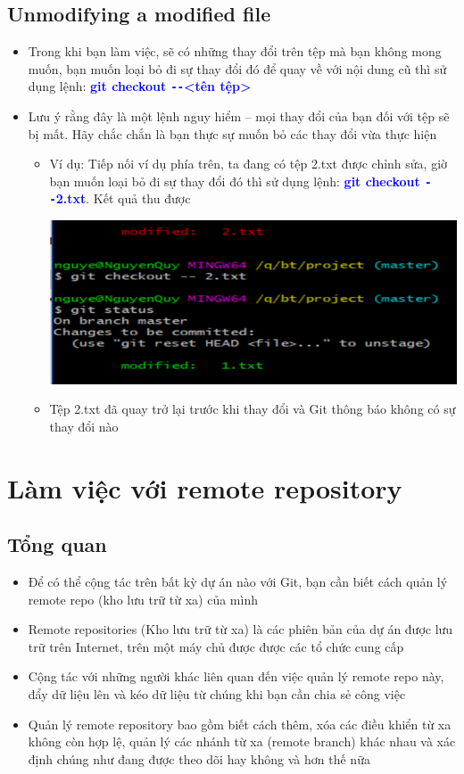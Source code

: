 \documentclass[12pt,a4paper]{report}
\begin{document}
\subsection{Unmodifying a modified file}
\begin{itemize}
\item Trong khi bạn làm việc, sẽ có những thay đổi trên tệp mà bạn không mong muốn, bạn muốn loại bỏ đi sự thay đổi đó để quay về với nội dung cũ thì sử dụng lệnh: \textcolor{blue}{\bf git checkout \texttt{-{}-}<tên tệp>}\vskip 0.4cm
\item Lưu ý rằng đây là một lệnh nguy hiểm – mọi thay đổi của bạn đối với tệp sẽ bị mất. Hãy chắc chắn là bạn thực sự muốn bỏ các thay đổi vừa thực hiện
	\begin{itemize}
\item Ví dụ: Tiếp nối ví dụ phía trên, ta đang có tệp 2.txt được chỉnh sửa, giờ bạn muốn loại bỏ đi sự thay đổi đó thì sử dụng lệnh: \textcolor{blue}{\bf git checkout \texttt{-{}-}2.txt}. Kết quả thu được

	\includegraphics[width=0.8\linewidth]{screenshot031}

	\label{fig:screenshot031}

\item Tệp 2.txt đã quay trở lại trước khi thay đổi và Git thông báo không có sự thay đổi nào
\end{itemize}\end{itemize}

\section{Làm việc với remote repository}
\subsection{Tổng quan} 
\begin{itemize}
\item Để có thể cộng tác trên bất kỳ dự án nào với Git, bạn cần biết cách quản lý remote repo (kho lưu trữ từ xa) của mình
\item Remote repositories (Kho lưu trữ từ xa) là các phiên bản của dự án được lưu trữ trên Internet,  trên một máy chủ được được các tổ chức cung cấp
\item Cộng tác với những người khác liên quan đến việc quản lý remote repo này, đẩy dữ liệu lên và kéo dữ liệu  từ chúng khi bạn cần chia sẻ công việc
\item Quản lý remote repository bao gồm biết cách thêm, xóa các điều khiển từ xa không còn hợp lệ, quản lý các nhánh từ xa (remote branch) khác nhau và xác định chúng như đang được theo dõi hay không và hơn thế nữa
\end{itemize}
\end{document}
